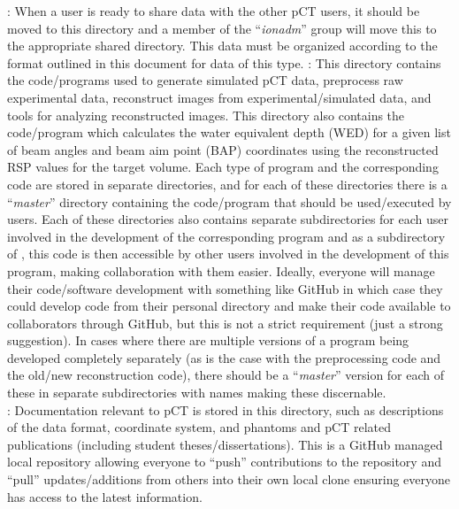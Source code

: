 \documentclass[landscape,12pt]{article}
\begin{document}
\vspace{-5mm}
\flushleft\textbf{}\color{Black} : When a user is ready to share data with the other pCT users, it should be moved to this directory and a member of the ``\textit{ionadm}'' group will move this to the appropriate shared directory.  This data must be organized according to the format outlined in this document for data of this type.
\vspace{-5mm}
\flushleft\textbf{}\color{Black} : This directory contains the code/programs used to generate simulated pCT data, preprocess raw experimental data, reconstruct images from experimental/simulated data, and tools for analyzing reconstructed images.  This directory also contains the code/program which calculates the water equivalent depth (WED) for a given list of beam angles and beam aim point (BAP) coordinates using the reconstructed RSP values for the target volume.  Each type of program and the corresponding code are stored in separate directories, and for each of these directories there is a ``\textit{master}'' directory containing the code/program that should be used/executed by users.  Each of these directories also contains separate subdirectories for each user involved in the development of the corresponding program and as a subdirectory of \textbf{}\color{Black}, this code is then accessible by other users involved in the development of this program, making collaboration with them easier.  Ideally, everyone will manage their code/software development with something like GitHub in which case they could develop code from their personal directory and make their code available to collaborators through GitHub, but this is not a strict requirement (just a strong suggestion).  In cases where there are multiple versions of a program being developed completely separately (as is the case with the preprocessing code and the old/new reconstruction code), there should be a ``\textit{master}'' version for each of these in separate subdirectories with names making these discernable.\\
\vspace{-5mm}
\flushleft\textbf{}\color{Black} : Documentation relevant to pCT is stored in this directory, such as descriptions of the data format, coordinate system, and phantoms and pCT related publications (including student theses/dissertations).  This is a GitHub managed local repository allowing everyone to ``push'' contributions to the repository and ``pull'' updates/additions from others into their own local clone ensuring everyone has access to the latest information.\\
\end{document}
